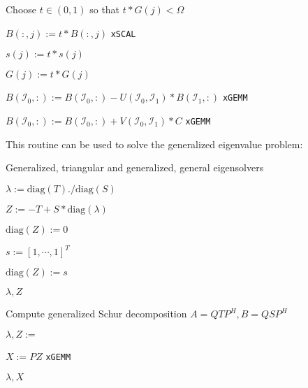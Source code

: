 \documentclass{article}
\begin{document}
\begin{algorithm}[H]
\begin{algorithmic}
    \State Choose \(t\in\left(0,1\right)\) so that \(t * G(j) < \Omega\)

    \State \(B(:,j) := t * B(:,j)\) \Comment \texttt{xSCAL}

    \State \(s(j) := t* s(j)\)

    \State \(G(j) := t * G(j)\)    

    \EndIf

    \EndFor

    \State \( B(\mathcal{I}_0,:) := B(\mathcal{I}_0,:) - U(\mathcal{I}_0,\mathcal{I}_1) * B(\mathcal{I}_1,:) \)
    \Comment \texttt{xGEMM}

    \State \( B(\mathcal{I}_0,:) := B(\mathcal{I}_0,:) + V(\mathcal{I}_0,\mathcal{I}_1) * C \)
    \Comment \texttt{xGEMM}

    \EndFor

    \EndProcedure
  \end{algorithmic}
\end{algorithm}
\noindent
This routine can be used to solve the generalized eigenvalue problem:
\begin{algorithm}[H]
  \caption{Generalized, triangular and generalized, general
    eigensolvers}
  \label{algorithm:eig}
  \begin{algorithmic}
    

    \State \(\lambda := \text{diag}(T) ./ \text{diag}(S)\)

    \State \(Z := -T + S * \text{diag}(\lambda)\)

    \State \(\text{diag}(Z) := 0\)

    \State \(s := \left[1,\cdots,1\right]^T\)

    \State {}

    \State \(\text{diag}(Z) := s\)

    \State \Return \(\lambda, Z\)

    \EndFunction


    \State Compute generalized Schur decomposition \(A=QTP^H, B=QSP^H\)

    \State \(\lambda, Z := \) 

    \State \(X := P Z\) \Comment \texttt{xGEMM}

    \State \Return \(\lambda, X\)

    \EndFunction

  \end{algorithmic}
\end{algorithm}

{}

\end{document}
